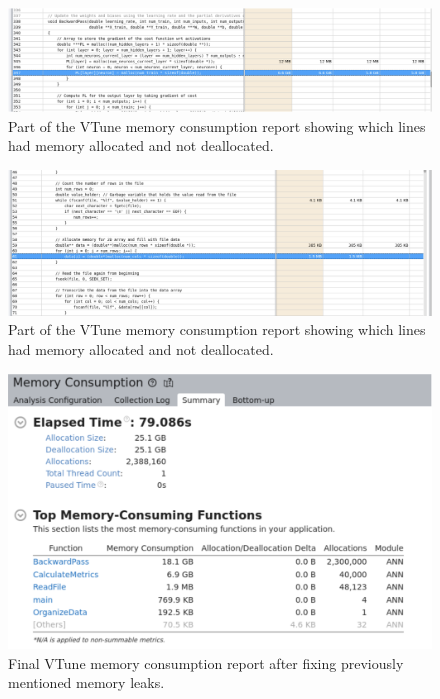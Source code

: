 \documentclass[12pt]{article}
\begin{document}
\begin{figure}[h]
    \centering
    \includegraphics[width=\textwidth]{Figure4.png}
    \caption{Part of the VTune memory consumption report showing which lines had memory allocated and not deallocated.}
    \label{fig:figure4}
\end{figure}

\begin{figure}[h]
    \centering
    \includegraphics[width=\textwidth]{Figure5.png}
    \caption{Part of the VTune memory consumption report showing which lines had memory allocated and not deallocated.}
    \label{fig:figure5}
\end{figure}

\begin{figure}[h]
    \centering
    \includegraphics[width=\textwidth]{Figure6.png}
    \caption{Final VTune memory consumption report after fixing previously mentioned memory leaks.}
    \label{fig:figure6}
\end{figure}
\end{document}

